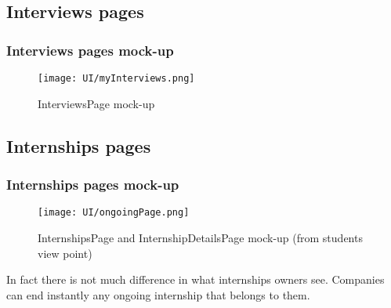 	\subsection{Interviews pages}
	\subsubsection{Interviews pages mock-up}
	\begin{figure}[H]
		\centering
		\caption{InterviewsPage mock-up}
		\texttt{[image: UI/myInterviews.png]}
	\end{figure}
	\subsection{Internships pages}
	\subsubsection{Internships pages mock-up}
	\begin{figure}[H]
		\centering
		\caption{InternshipsPage and InternshipDetailsPage mock-up (from students view point)}
		\texttt{[image: UI/ongoingPage.png]}
	\end{figure}
	In fact there is not much difference in what internships owners see. Companies can end instantly any ongoing internship that belongs to them.
